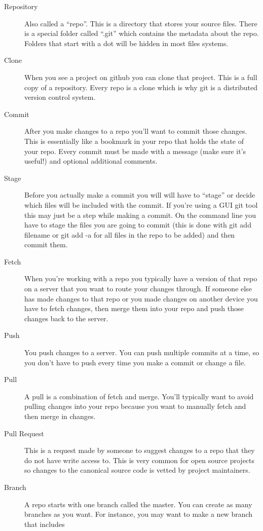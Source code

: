 \begin{description}
	\item[Repository] Also called a ``repo''. This is a directory that stores your source files. There is a special folder called ``.git'' which contains the metadata about the repo. Folders that start with a dot will be hidden in most files systems.
	\item[Clone] When you see a project on github you can clone that project. This is a full copy of a repository. Every repo is a clone which is why git is a distributed version control system. 
	\item[Commit] After you make changes to a repo you'll want to commit those changes. This is essentially like a bookmark in your repo that holds the state of your repo. Every commit must be made with a message (make sure it's useful!) and optional additional comments.
	\item[Stage] Before you actually make a commit you will will have to ``stage'' or decide which files will be included with the commit. If you're using a GUI git tool this may just be a step while making a commit. On the command line you have to stage the files you are going to commit (this is done with git add filename or git add -a for all files in the repo to be added) and then commit them.
	\item[Fetch] When you're working with a repo you typically have a version of that repo on a server that you want to route your changes through. If someone else has made changes to that repo or you made changes on another device you have to fetch changes, then merge them into your repo and push those changes back to the server.
	\item[Push] You push changes to a server. You can push multiple commits at a time, so you don't have to push every time you make a commit or change a file.
	\item[Pull] A pull is a combination of fetch and merge. You'll typically want to avoid pulling changes into your repo because you want to manually fetch and then merge in changes.
	\item[Pull Request] This is a request made by someone to suggest changes to a repo that they do not have write access to. This is very common for open source projects so changes to the canonical source code is vetted by project maintainers.
	\item[Branch] A repo starts with one branch called the master. You can create as many branches as you want. For instance, you may want to make a new branch that includes 

\end{description}
